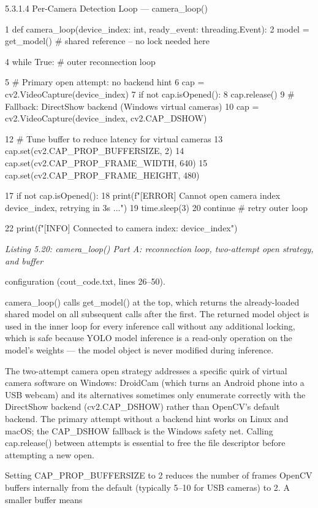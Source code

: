 5.3.1.4 Per-Camera Detection Loop --- camera\_loop()

1 def camera\_loop(device\_index: int, ready\_event: threading.Event):
2 model = get\_model() \# shared reference -- no lock needed here

4 while True: \# outer reconnection loop




5 \# Primary open attempt: no backend hint
6 cap = cv2.VideoCapture(device\_index)
7 if not cap.isOpened():
8 cap.release()
9 \# Fallback: DirectShow backend (Windows virtual cameras)
10 cap = cv2.VideoCapture(device\_index, cv2.CAP\_DSHOW)


12 \# Tune buffer to reduce latency for virtual cameras
13 cap.set(cv2.CAP\_PROP\_BUFFERSIZE, 2)
14 cap.set(cv2.CAP\_PROP\_FRAME\_WIDTH, 640)
15 cap.set(cv2.CAP\_PROP\_FRAME\_HEIGHT, 480)


17 if not cap.isOpened():
18 print(f"[ERROR] Cannot open camera index {device\_index}, retrying in 3s
...")
19 time.sleep(3)
20 continue \# retry outer loop

22 print(f"[INFO] Connected to camera index: {device\_index}")


\textit{Listing 5.20: camera\_loop() Part A: reconnection loop, two-attempt open strategy, and buffer}

conﬁguration (cout\_code.txt, lines 26--50).


camera\_loop() calls get\_model() at the top, which returns the already-loaded shared
model on all subsequent calls after the ﬁrst. The returned model object is used in the inner
loop for every inference call without any additional locking, which is safe because YOLO
model inference is a read-only operation on the model's weights --- the model object is
never modiﬁed during inference.

The two-attempt camera open strategy addresses a speciﬁc quirk of virtual camera
software on Windows: DroidCam (which turns an Android phone into a USB webcam) and
its alternatives sometimes only enumerate correctly with the DirectShow backend (cv2.CAP\_DSHOW)
rather than OpenCV's default backend. The primary attempt without a backend hint works
on Linux and macOS; the CAP\_DSHOW fallback is the Windows safety net. Calling cap.release()
between attempts is essential to free the ﬁle descriptor before attempting a new open.

Setting CAP\_PROP\_BUFFERSIZE to 2 reduces the number of frames OpenCV buffers
internally from the default (typically 5--10 for USB cameras) to 2. A smaller buffer means



